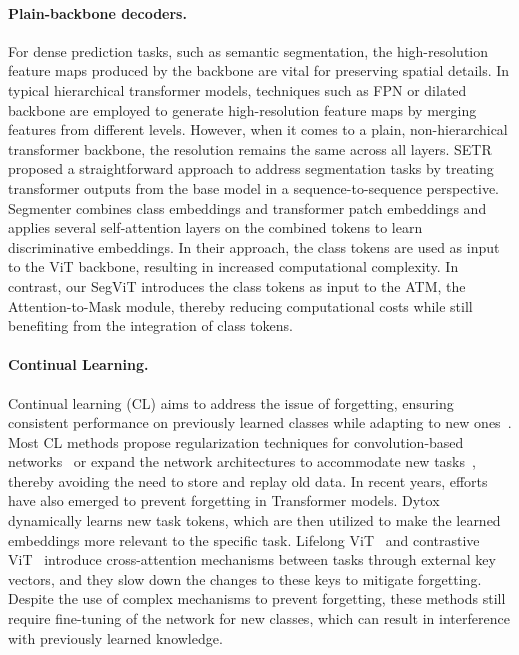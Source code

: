 \paragraph{Plain-backbone decoders.}
For dense prediction tasks, such as semantic segmentation, the high-resolution feature maps produced by the backbone are vital for preserving spatial details. In typical hierarchical transformer models, techniques such as FPN \cite{fpn} or dilated backbone are employed to generate high-resolution feature maps by merging features from different levels. However, when it comes to a plain, non-hierarchical transformer backbone, the resolution remains the same across all layers.
SETR \cite{setr} proposed a straightforward approach to address segmentation tasks by treating transformer outputs from the base model in a sequence-to-sequence perspective. Segmenter \cite{strudel2021segmenter} combines class embeddings and transformer patch embeddings and applies several self-attention layers on the combined tokens to learn discriminative embeddings. In their approach, the class tokens are used as input to the ViT backbone, resulting in increased computational complexity.
In contrast, our SegViT introduces the class tokens as input to the ATM, the Attention-to-Mask module, thereby reducing computational costs while still benefiting from the integration of class tokens.

\paragraph{Continual Learning.} Continual learning (CL) aims to address the issue of forgetting, ensuring consistent performance on previously learned classes while adapting to new ones~\cite{chen2016LifelongML}. Most CL methods propose regularization techniques for convolution-based networks~\cite{li2018LearningWF,douillard2020podnet,kang2022class,peng2021hierarchical} or expand the network architectures to accommodate new tasks~\cite{yan2021dynamically}, thereby avoiding the need to store and replay old data.
In recent years, efforts have also emerged to prevent forgetting in Transformer models. Dytox~\cite{douillard2022dytox} dynamically learns new task tokens, which are then utilized to make the learned embeddings more relevant to the specific task. Lifelong ViT~\cite{wang2022continual} and contrastive ViT~\cite{wang2022online} introduce cross-attention mechanisms between tasks through external key vectors, and they slow down the changes to these keys to mitigate forgetting. Despite the use of complex mechanisms to prevent forgetting, these methods still require fine-tuning of the network for new classes, which can result in interference with previously learned knowledge.


